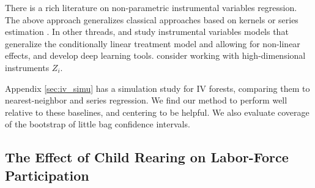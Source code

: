 \documentclass[aos]{imsart}
\theoremstyle{plain}
\theoremstyle{definition}
\theoremstyle{remark}
\begin{document}
\begin{CJK}{UTF8}{gbsn}
There is a rich literature on non-parametric instrumental variables regression. The above approach
generalizes classical approaches based on kernels or series estimation
\citep{abadie2003semiparametric,su2013local,wooldridge2010econometric}. In other threads,
\citet{darolles2011nonparametric} and \citet{newey2003instrumental} study instrumental variables
models that generalize the conditionally linear treatment model and allowing for non-linear
effects, and \citet{hartford2016counterfactual} develop deep learning tools.
\citet{belloni2012sparse} consider working with high-dimensional instruments $Z_i$.

Appendix \ref{sec:iv_simu} has a simulation study for IV forests, comparing
them to nearest-neighbor and series regression. We find our method to perform well relative to these
baselines, and centering to be helpful. We also evaluate
coverage of the bootstrap of little bag confidence intervals.

\subsection{The Effect of Child Rearing on Labor-Force Participation}
\label{sec:angrist_evans}


\end{CJK}
\end{document}
